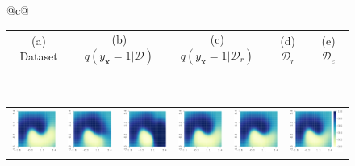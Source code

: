 \documentclass{article}
\theoremstyle{definition}
\newcommand{\mbf}[1]{\mathbf{#1}}
\newcommand{\mcl}[1]{\mathcal{#1}}
\newcommand{\da}{\mcl{D}}
\newcommand{\dc}{\mcl{D}_r}
\newcommand{\dr}{\mcl{D}_e}
\begin{document}
\begin{figure}
\begin{tabular}{@{}c@{}}
\begin{tabular}{@{}c@{}c@{}c@{}c@{}c@{}}
    \\
    (a) Dataset
    &
    (b) $q(y_{\mbf{x}}=1| \da)$ %
    & \hspace{1mm}
    (c) $q(y_{\mbf{x}}=1| \dc)$ %
    &
    (d) $\dc$
    &
    (e) $\dr$
    \end{tabular}
\vspace{2mm}\\
    \begin{tabular}{@{}c@{}c@{}c@{}|@{}c@{}c@{}c@{}}
    \includegraphics[height=0.135\textwidth]{img/moon/moon_eubo_prob_1e-05.pdf}
    &\hspace{2.5mm}
    \includegraphics[height=0.135\textwidth]{img/moon/moon_eubo_prob_1e-09.pdf}
    &\hspace{2.5mm}
    \includegraphics[height=0.135\textwidth]{img/moon/moon_eubo_prob_0_0.pdf}\hspace{2mm}
    &
    \hspace{2mm}
    \includegraphics[height=0.135\textwidth]{img/moon/moon_elbo_prob_1e-05.pdf}
    &\hspace{2.5mm}
    \includegraphics[height=0.135\textwidth]{img/moon/moon_elbo_prob_1e-09.pdf}
    &\hspace{2.5mm}
    \includegraphics[height=0.135\textwidth]{img/moon/moon_elbo_prob_0_0.pdf}

\end{tabular}
\end{tabular}
\end{figure}
\end{document}
